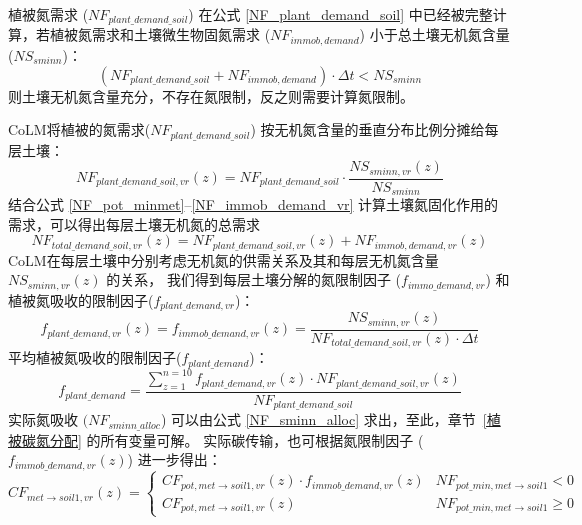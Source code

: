植被氮需求 ($NF_{plant\_{demand\_{soil}}}$) 在公式 \eqref{NF_plant_demand_soil} 中已经被完整计算，若植被氮需求和土壤微生物固氮需求 ($NF_{immob,demand}$) 小于总土壤无机氮含量(${NS}_{sminn}$)：
\begin{equation}
    \left(NF_{plant\_{demand\_{soil}}}+NF_{immob,demand}\right)\cdot\Delta t<NS_{sminn}
\end{equation}
则土壤无机氮含量充分，不存在氮限制，反之则需要计算氮限制。

CoLM将植被的氮需求($NF_{plant\_{demand\_{soil}}}$) 按无机氮含量的垂直分布比例分摊给每层土壤：
\begin{equation}
    NF_{plant\_{demand\_{soil}},vr}(z)=NF_{plant\_{demand\_{soil}}}\cdot\frac{NS_{sminn,vr}(z)}{NS_{sminn}}
\end{equation}
结合公式 \eqref{NF_pot_minmet}--\eqref{NF_immob_demand_vr} 计算土壤氮固化作用的需求，可以得出每层土壤无机氮的总需求
\begin{equation}
    NF_{total\_{demand\_{soil}},vr}(z)=NF_{plant\_{demand\_{soil}},vr}(z)+NF_{immob,demand,vr}\left(z\right)
\end{equation}
CoLM在每层土壤中分别考虑无机氮的供需关系及其和每层无机氮含量 ${NS}_{sminn,vr}(z)$ 的关系，
我们得到每层土壤分解的氮限制因子 ($f_{immo\_{demand},vr}$) 和植被氮吸收的限制因子($f_{plant\_{demand},vr}$)：
\begin{equation}
    f_{plant\_{demand},vr}(z)=f_{immob\_{demand},vr}(z)=\frac{NS_{sminn,vr}(z)}{NF_{total\_{demand\_{soil}},vr}(z)\cdot\Delta t}
\end{equation}
平均植被氮吸收的限制因子($f_{plant\_{demand}}$)：
\begin{equation}
    f_{plant\_{demand}}=\frac{\sum_{z=1}^{n=10}{f_{plant\_{demand},vr}(z)\cdot NF_{plant\_{demand\_{soil}},vr}(z)}}{NF_{plant\_{demand\_{soil}}}}
\end{equation}
实际氮吸收 $(NF_{sminn\_{alloc}}$) 可以由公式 \eqref{NF_sminn_alloc} 求出，至此，章节~\ref{植被碳氮分配} 的所有变量可解。
实际碳传输，也可根据氮限制因子 ($f_{immob\_{demand},vr}(z)$) 进一步得出：
\begin{equation}
CF_{met \rightarrow { soil1,vr }}(z)=\left\{\begin{array}{ll}C F_{pot, met \rightarrow soil1, vr}(z) \cdot f_{{immob}\_{demand}, vr}(z) & NF_{pot\_{min}, met \rightarrow {soil1}} <0 \\ 
CF_{pot, met \rightarrow { soil1,vr }}(z) & NF_{pot\_{min}, met \rightarrow {soil1}} \geqslant 0
\end{array}\right.
\end{equation}
